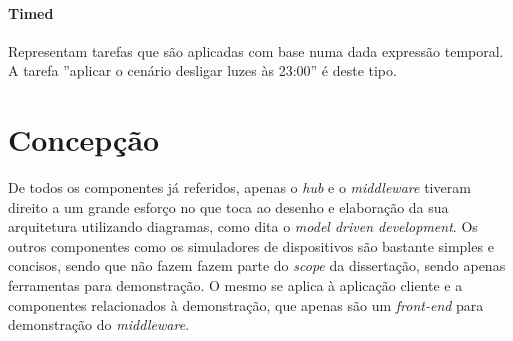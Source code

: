 \paragraph*{Timed}
Representam tarefas que são aplicadas com base numa dada expressão temporal. A tarefa ''aplicar o cenário desligar luzes às 23:00'' é deste tipo.

\section{Concepção}

De todos os componentes já referidos, apenas o \textit{hub} e o \textit{middleware} tiveram direito a um grande esforço no que toca ao desenho e elaboração da sua arquitetura utilizando diagramas, como dita o \textit{model driven development}. Os outros componentes como os simuladores de dispositivos são bastante simples e concisos, sendo que não fazem fazem parte do \textit{scope} da dissertação, sendo apenas ferramentas para demonstração. O mesmo se aplica à aplicação cliente e a componentes relacionados à demonstração, que apenas são um \textit{front-end} para demonstração do \textit{middleware}.



